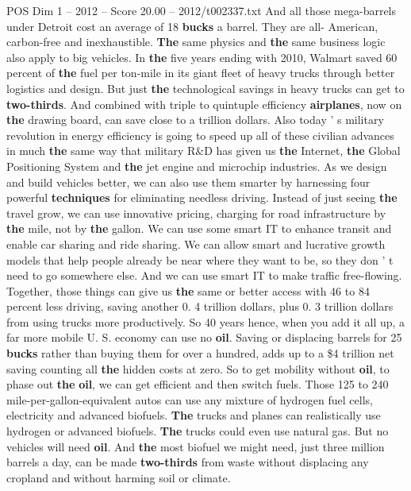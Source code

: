 \begin{textsample}{POS Dim 1 – 2012 – Score 20.00 – 2012/t002337.txt}
And all those mega-barrels under Detroit cost an average of 18 \textbf{bucks} a barrel.
They are all- American, carbon-free and inexhaustible. \textbf{The} same physics and \textbf{the} same business logic also apply to big vehicles.
In \textbf{the} five years ending with 2010, Walmart saved 60 percent of \textbf{the} fuel per ton-mile in its giant fleet of heavy trucks through better logistics and design.
But just \textbf{the} technological savings in heavy trucks can get to \textbf{two-thirds}.
And combined with triple to quintuple efficiency \textbf{airplanes}, now on \textbf{the} drawing board, can save close to a trillion dollars.
Also today ' s military revolution in energy efficiency is going to speed up all of these civilian advances in much \textbf{the} same way that military R\&D has given us \textbf{the} Internet, \textbf{the} Global Positioning System and \textbf{the} jet engine and microchip industries.
As we design and build vehicles better, we can also use them smarter by harnessing four powerful \textbf{techniques} for eliminating needless driving.
Instead of just seeing \textbf{the} travel grow, we can use innovative pricing, charging for road infrastructure by \textbf{the} mile, not by \textbf{the} gallon.
We can use some smart IT to enhance transit and enable car sharing and ride sharing.
We can allow smart and lucrative growth models that help people already be near where they want to be, so they don ' t need to go somewhere else.
And we can use smart IT to make traffic free-flowing.
Together, those things can give us \textbf{the} same or better access with 46 to 84 percent less driving, saving another 0. 4 trillion dollars, plus 0. 3 trillion dollars from using trucks more productively.
So 40 years hence, when you add it all up, a far more mobile U.
S. economy can use no \textbf{oil}.
Saving or displacing barrels for 25 \textbf{bucks} rather than buying them for over a hundred, adds up to a \$4 trillion net saving counting all \textbf{the} hidden costs at zero.
So to get mobility without \textbf{oil}, to phase out \textbf{the} \textbf{oil}, we can get efficient and then switch fuels.
Those 125 to 240 mile-per-gallon-equivalent autos can use any mixture of hydrogen fuel cells, electricity and advanced biofuels. \textbf{The} trucks and planes can realistically use hydrogen or advanced biofuels. \textbf{The} trucks could even use natural gas.
But no vehicles will need \textbf{oil}.
And \textbf{the} most biofuel we might need, just three million barrels a day, can be made \textbf{two-thirds} from waste without displacing any cropland and without harming soil or climate.

\end{textsample}
